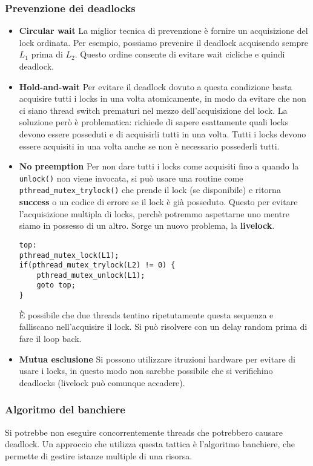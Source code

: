\documentclass[12pt, letterpaper]{article}
\begin{document}
			\subsubsection{Prevenzione dei deadlocks}
				\begin{itemize}
					\item \textbf{Circular wait} La miglior tecnica di prevenzione è fornire un acquisizione del lock ordinata. Per esempio, possiamo prevenire il deadlock acquisendo sempre $L_1$ prima di $L_2$. Questo ordine consente di evitare wait cicliche e quindi deadlock.
					\item \textbf{Hold-and-wait} Per evitare il deadlock dovuto a questa condizione basta acquisire tutti i locks in una volta atomicamente, in modo da evitare che non ci siano thread switch prematuri nel mezzo dell'acquisizione del lock. La soluzione però è problematica: richiede di sapere esattamente quali locks devono essere posseduti e di acquisirli tutti in una volta. Tutti i locks devono essere acquisiti in una volta anche se non è necessario possederli tutti.
					\item \textbf{No preemption} Per non dare tutti i locks come acquisiti fino a quando la \texttt{unlock()} non viene invocata, si può usare una routine come \texttt{pthread\_mutex\_trylock()} che prende il lock (se disponibile) e ritorna \textbf{success} o un codice di errore se il lock è già posseduto. Questo per evitare l'acquisizione multipla di locks, perchè potremmo aspettarne uno mentre siamo in possesso di un altro. Sorge un nuovo problema, la \textbf{livelock}. 
					\begin{lstlisting}[style=CStyle]
top:
pthread_mutex_lock(L1);
if(pthread_mutex_trylock(L2) != 0) {
	pthread_mutex_unlock(L1);
	goto top;
}					\end{lstlisting}					
					È possibile che due threads tentino ripetutamente questa sequenza e falliscano nell'acquisire il lock. Si può risolvere con un delay random prima di fare il loop back.
					\item \textbf{Mutua esclusione} Si possono utilizzare itruzioni hardware per evitare di usare i locks, in questo modo non sarebbe possibile che si verifichino deadlocks (livelock può comunque accadere).
				\end{itemize}
				
			\subsubsection{Algoritmo del banchiere}
				Si potrebbe non eseguire concorrentemente threads che potrebbero causare deadlock. Un approccio che utilizza questa tattica è l'algoritmo banchiere, che permette di gestire istanze multiple di una risorsa. 
				
\end{document}
